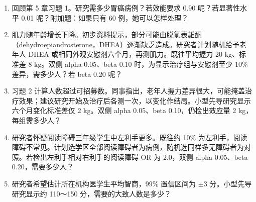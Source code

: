 \clearpage
{}
\begin{enumerate}
\item 回顾第 5 章习题 1。研究需多少胃癌病例？若效能要求 0.90 呢？若显著性水平 0.01 呢？附加题：如果只有 60 例，她可以怎样处理？
\item 肌力随年龄增长下降。初步资料提示，部分可能由脱氢表雄酮（dehydroepiandrosterone，DHEA）逐渐缺乏造成。研究者计划随机给予老年人 DHEA 或相同外观安慰剂六个月，再测肌力。既往平均握力 20 kg、标准差 8 kg。双侧 alpha 0.05、beta 0.10 时，为显示治疗组与安慰剂至少 10\% 差异，需多少人？若 beta 0.20 呢？
\item 习题 2 计算人数超过可招募数。同事指出，老年人握力差异很大，可能掩盖治疗效果；建议研究开始及治疗后各测一次，以变化作结局。小型先导研究显示六个月变化标准差仅 2 kg。双侧 alpha 0.05、beta 0.10，仍检出效应量 2 kg，每组需多少人？
\item 研究者怀疑阅读障碍三年级学生中左利手更多。既往约 10\% 为左利手，阅读障碍不常见。计划选学区全部阅读障碍者为病例，随机选同样多无障碍者为对照。若检出左利手相对右利手的阅读障碍 OR 为 2.0，双侧 alpha 0.05、beta 0.20，需要多少人？
\item 研究者希望估计所在机构医学生平均智商，99\% 置信区间为 $\pm3$ 分。小型先导研究显示约 110～150 分，需要的大致人数是多少？
\end{enumerate}
